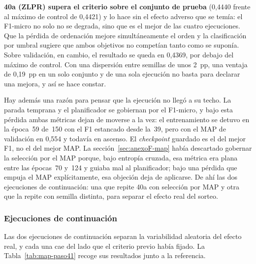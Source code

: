 \textbf{40a (ZLPR) supera el criterio sobre el conjunto de prueba} (0{,}4440 frente al máximo de control de 0{,}4421) y lo hace sin el efecto adverso que se temía: el F1-micro no solo no se degrada, sino que es el mejor de las cuatro ejecuciones. Que la pérdida de ordenación mejore simultáneamente el orden y la clasificación por umbral sugiere que ambos objetivos no competían tanto como se suponía. Sobre validación, en cambio, el resultado se queda en 0{,}4369, por debajo del máximo de control. Con una dispersión entre semillas de unos 2~pp, una ventaja de 0{,}19~pp en un solo conjunto y de una sola ejecución no basta para declarar una mejora, y así se hace constar.

Hay además una razón para pensar que la ejecución no llegó a su techo. La parada temprana y el planificador se gobiernan por el F1-micro, y bajo esta pérdida ambas métricas dejan de moverse a la vez: el entrenamiento se detuvo en la época~59 de~150 con el F1 estancado desde la~39, pero con el MAP de validación en 0{,}554 y todavía en ascenso. El \emph{checkpoint} guardado es el del mejor F1, no el del mejor MAP. La sección~\ref{sec:anexoF-map} había descartado gobernar la selección por el MAP porque, bajo entropía cruzada, esa métrica era plana entre las épocas~70 y~124 y guiaba mal al planificador; bajo una pérdida que empuja el MAP explícitamente, esa objeción deja de aplicarse. De ahí las dos ejecuciones de continuación: una que repite 40a con selección por MAP y otra que la repite con semilla distinta, para separar el efecto real del sorteo.

\subsubsection*{Ejecuciones de continuación}

Las dos ejecuciones de continuación separan la variabilidad aleatoria del efecto real, y cada una cae del lado que el criterio previo había fijado. La Tabla~\ref{tab:map-paso41} recoge sus resultados junto a la referencia.

